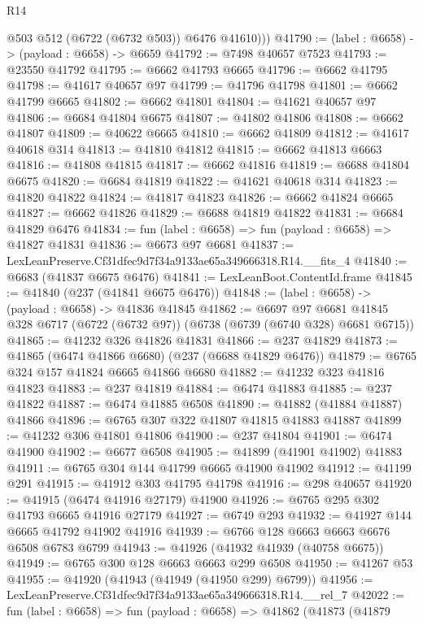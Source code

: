 \begin{lexlean}{R14}
\begin{coremodule}
          @503
          @512
          (@6722 (@6732 @503))
          @6476
          @41610)))
@41790 := (label : @6658) -> (payload : @6658) -> @6659
@41792 := @7498 @40657 @7523
@41793 := @23550 @41792
@41795 := @6662 @41793 @6665
@41796 := @6662 @41795
@41798 := @41617 @40657 @97
@41799 := @41796 @41798
@41801 := @6662 @41799 @6665
@41802 := @6662 @41801
@41804 := @41621 @40657 @97
@41806 := @6684 @41804 @6675
@41807 := @41802 @41806
@41808 := @6662 @41807
@41809 := @40622 @6665
@41810 := @6662 @41809
@41812 := @41617 @40618 @314
@41813 := @41810 @41812
@41815 := @6662 @41813 @6663
@41816 := @41808 @41815
@41817 := @6662 @41816
@41819 := @6688 @41804 @6675
@41820 := @6684 @41819
@41822 := @41621 @40618 @314
@41823 := @41820 @41822
@41824 := @41817 @41823
@41826 := @6662 @41824 @6665
@41827 := @6662 @41826
@41829 := @6688 @41819 @41822
@41831 := @6684 @41829 @6476
@41834 := fun (label : @6658) => fun (payload : @6658) => @41827 @41831
@41836 := @6673 @97 @6681
@41837 := LexLeanPreserve.Cf31dfec9d7f34a9133ae65a349666318.R14.__fits_4
@41840 := @6683 (@41837 @6675 @6476)
@41841 := LexLeanBoot.ContentId.frame
@41845 := @41840 (@237 (@41841 @6675 @6476))
@41848 := (label : @6658) -> (payload : @6658) -> @41836 @41845
@41862 := @6697
    @97
    @6681
    @41845
    @328
    @6717
    (@6722 (@6732 @97))
    (@6738 (@6739 (@6740 @328) @6681 @6715))
@41865 := @41232 @326 @41826 @41831
@41866 := @237 @41829
@41873 := @41865 (@6474 @41866 @6680) (@237 (@6688 @41829 @6476))
@41879 := @6765 @324 @157 @41824 @6665 @41866 @6680
@41882 := @41232 @323 @41816 @41823
@41883 := @237 @41819
@41884 := @6474 @41883
@41885 := @237 @41822
@41887 := @6474 @41885 @6508
@41890 := @41882 (@41884 @41887) @41866
@41896 := @6765 @307 @322 @41807 @41815 @41883 @41887
@41899 := @41232 @306 @41801 @41806
@41900 := @237 @41804
@41901 := @6474 @41900
@41902 := @6677 @6508
@41905 := @41899 (@41901 @41902) @41883
@41911 := @6765 @304 @144 @41799 @6665 @41900 @41902
@41912 := @41199 @291
@41915 := @41912 @303 @41795 @41798
@41916 := @298 @40657
@41920 := @41915 (@6474 @41916 @27179) @41900
@41926 := @6765 @295 @302 @41793 @6665 @41916 @27179
@41927 := @6749 @293
@41932 := @41927 @144 @6665 @41792 @41902 @41916
@41939 := @6766 @128 @6663 @6663 @6676 @6508 @6783 @6799
@41943 := @41926 (@41932 @41939 (@40758 @6675))
@41949 := @6765 @300 @128 @6663 @6663 @299 @6508
@41950 := @41267 @53
@41955 := @41920 (@41943 (@41949 (@41950 @299) @6799))
@41956 := LexLeanPreserve.Cf31dfec9d7f34a9133ae65a349666318.R14.__rel_7
@42022 := fun (label : @6658) =>
  fun (payload : @6658) =>
  @41862
    (@41873
      (@41879

\end{coremodule}
\end{lexlean}
